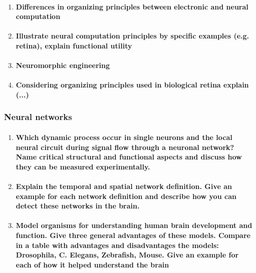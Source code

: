 \documentclass[12pt,article,oneside,a4paper]{memoir}
\begin{document}
\begin{enumerate}
\item \paragraph{Differences in organizing principles between electronic and neural computation}

\item \paragraph{Illustrate neural computation principles by specific examples (e.g. retina), explain functional utility}

\item \paragraph{Neuromorphic engineering}

\item \paragraph{Considering organizing principles used in biological retina explain (...)}

\end{enumerate}

\subsubsection{Neural networks}
\begin{enumerate}
\item \paragraph{Which dynamic process occur in single neurons and the local neural circuit during signal flow through a neuronal network? Name critical structural and functional aspects and discuss how they can be measured experimentally.}

\item \paragraph{Explain the temporal and spatial network definition. Give an example for each network definition and describe how you can detect these networks in the brain.}

\item \paragraph{Model organisms for understanding human brain development and function. Give three general advantages of these models. Compare in a table with advantages and disadvantages the models: Drosophila, C. Elegans, Zebrafish, Mouse. Give an example for each of how it helped understand the brain}

\end{enumerate}
\end{document}
